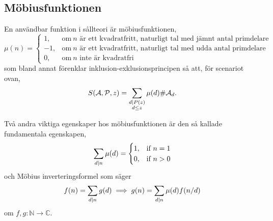 \subsection{Möbiusfunktionen}
En användbar funktion i sållteori är möbiusfunktionen,
\begin{equation*}
    \mu(n) = 
    \begin{cases}
        1, & \text{om}\ n \text{ är ett kvadratfritt, naturligt tal med jämnt antal primdelare}\\
        -1, & \text{om}\ n \text{ är ett kvadratfritt, naturligt tal med udda antal primdelare}\\
        0, & \text{om}\ n \text{ inte är kvadratfri}
    \end{cases}
\end{equation*}
som bland annat förenklar inklusion-exklusionsprincipen så att, för scenariot ovan,
\begin{align*}
    S(\mathcal{A}, \mathcal{P}, z) = \sum_{\substack{d \mid P(z) \\ d \leq z}} \mu(d) \# \mathcal{A}_d .
\end{align*} %

Två andra viktiga egenskaper hos möbiusfunktionen är den så kallade fundamentala egenskapen,
\begin{equation*}
    \sum_{d \mid n} \mu(d) =
    \begin{cases}
        1, & \text{if}\ n = 1 \\
        0, & \text{if}\ n > 0
    \end{cases}
\end{equation*}
och Möbius inverteringsformel som säger
\begin{equation} \label{mobiusinv}
    f(n) = \sum_{d \mid n} g(d) \implies g(n) = \sum_{d \mid n} \mu(d) f(n/d)
\end{equation}
om \(f, g : \mathbb{N} \to \mathbb{C}\).



